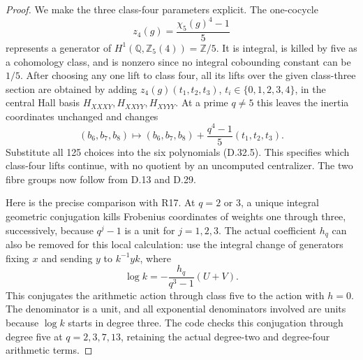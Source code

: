 \begin{proof}
We make the three class-four parameters explicit.
The one-cocycle
\[
                  z_4(g)=\frac{\chi_5(g)^4-1}{5}
                                                        \tag{D.32.8}
\]
represents a generator of
\(H^1(\mathbb Q,\mathbb Z_5(4))=\mathbb Z/5\).
It is integral, is killed by five as a
cohomology class, and is nonzero since no
integral cobounding constant can be \(1/5\).
After choosing any one lift to class four,
all its lifts over the given class-three
section are obtained by adding
\(z_4(g)(t_1,t_2,t_3)\),
\(t_i\in\{0,1,2,3,4\}\), in the central
Hall basis \(H_{XXXY},H_{XXYY},H_{XYYY}\).
At a prime \(q\ne5\) this leaves the
inertia coordinates unchanged and changes
\[
      (b_6,b_7,b_8)\longmapsto
      (b_6,b_7,b_8)+\frac{q^4-1}{5}(t_1,t_2,t_3).
                                                        \tag{D.32.9}
\]
Substitute all 125 choices into the six
polynomials (D.32.5). This specifies which
class-four lifts continue, with no quotient
by an uncomputed centralizer. The two fibre
groups now follow from D.13 and D.29.

Here is the precise comparison with R17. At
\(q=2\) or \(3\), a unique integral geometric
conjugation kills Frobenius coordinates of
weights one through three, successively,
because \(q^j-1\) is a unit for \(j=1,2,3\).
The actual coefficient \(h_q\) can also be
removed for this local calculation: use the
integral change of generators fixing \(x\)
and sending \(y\) to \(k^{-1}yk\), where
\[
             \log k=-\frac{h_q}{q^3-1}(U+V).
\]
This conjugates the arithmetic action through
class five to the action with \(h=0\).
The denominator is a unit, and all exponential
denominators involved are units because
\(\log k\) starts in degree three. The code
checks this conjugation through degree five
at \(q=2,3,7,13\), retaining the actual
degree-two and degree-four arithmetic terms.


\end{proof}
